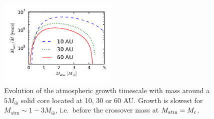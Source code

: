 \documentclass[apj, numberedappendix]{emulateapj}
\newcommand{\Figs}[2]{Figs.~\ref{#1} and \ref{#2}}
\newcommand{\co}{_{\rm c}}
\begin{document}







\begin{figure}[tb]
\centering
\includegraphics[width=0.5\textwidth]{../../figs/ModelAtmospheres/RadSelfGravPoly/PaperFigs/Mt_profile_temp.pdf}
\caption{Evolution of the atmospheric growth timescale with mass around a $5 M_{\oplus}$ solid core  located at 10, 30 or 60 AU.  Growth is slowest for $M_{\mathrm{atm}} \sim 1 - 3 M_{\oplus}$, i.e.\ before the crossover mass at $M_{\rm atm} = M\co$.}
\label{fig:growthtime}
\end{figure}
\end{document}
